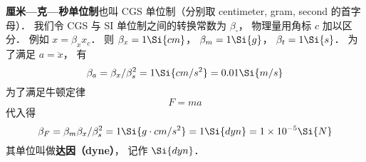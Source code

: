 
\textbf{厘米—克—秒单位制}也叫 CGS 单位制（分别取 centimeter, gram, second 的首字母）． 我们令 CGS 与 SI 单位制之间的转换常数为 $\beta_\square$， 物理量用角标 $c$ 加以区分． 例如 $x = \beta_x x_c$． 则 $\beta_x = 1\Si{cm}$， $\beta_m = 1\Si{g}$， $\beta_t = 1\Si{s}$．
为了满足 $a = \ddot x$， 有
\begin{equation}
\beta_a = \beta_x/\beta_s^2 = 1\Si{cm/s^2} = 0.01 \Si{m/s}
\end{equation}
为了满足牛顿定律
\begin{equation}
F = ma
\end{equation}
代入得
\begin{equation}
\beta_F = \beta_m \beta_x/\beta_s^2 = 1\Si{g \cdot cm/s^2} = 1\Si{dyn} = 1\times 10^{-5} \Si{N}
\end{equation}
其单位叫做\textbf{达因（dyne）}， 记作 $\Si{dyn}$．
